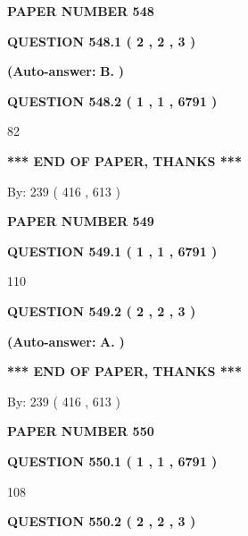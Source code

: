 \documentclass[12pt]{article}
\begin{document}
   
\newpage 
\setcounter{page}{ 
   548001 } 
   
   
 {\textbf{ \Large{ PAPER NUMBER  548  }}}
   
   
   
   
  
  
{\textbf{\large{QUESTION
548.1 
 ( 2 , 2 , 3 )
}}}
 
 
{\textbf{(Auto-answer:}}
{\textbf{\large{
B.}}}
{\textbf{)}}
 
 
  
  
{\textbf{\large{QUESTION
548.2 
 ( 1 , 1 , 6791 )
}}}

82
   
   
   
   
\vspace{1.0in} 
{\textbf{\large{ *** END OF PAPER, THANKS *** }}} 
   
   
\hspace{1.0in} By: 
 239 ( 416 ,  613 )
   
   
   
   
\newpage 
\setcounter{page}{ 
   549001 } 
   
   
 {\textbf{ \Large{ PAPER NUMBER  549  }}}
   
   
   
   
  
  
{\textbf{\large{QUESTION
549.1 
 ( 1 , 1 , 6791 )
}}}

110
  
  
{\textbf{\large{QUESTION
549.2 
 ( 2 , 2 , 3 )
}}}
 
 
{\textbf{(Auto-answer:}}
{\textbf{\large{
A.}}}
{\textbf{)}}
 
 
   
   
   
   
\vspace{1.0in} 
{\textbf{\large{ *** END OF PAPER, THANKS *** }}} 
   
   
\hspace{1.0in} By: 
 239 ( 416 ,  613 )
   
   
   
   
\newpage 
\setcounter{page}{ 
   550001 } 
   
   
 {\textbf{ \Large{ PAPER NUMBER  550  }}}
   
   
   
   
  
  
{\textbf{\large{QUESTION
550.1 
 ( 1 , 1 , 6791 )
}}}

108
  
  
{\textbf{\large{QUESTION
550.2 
 ( 2 , 2 , 3 )
}}}
 
\end{document}
